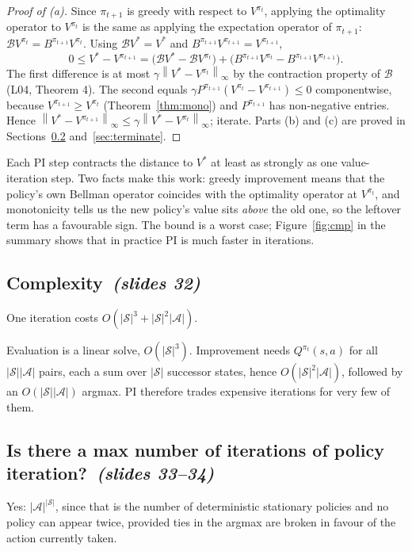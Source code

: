 \documentclass[11pt,a4paper]{article}
\newcommand{\Sset}{\mathcal{S}}
\newcommand{\Aset}{\mathcal{A}}
\newcommand{\B}{\mathcal{B}}
\newcommand{\norm}[1]{\left\lVert #1\right\rVert_\infty}
\newcommand{\sltag}[1]{\texorpdfstring{\ \emph{(slides #1)}}{ (slides #1)}}
\theoremstyle{plain}
\theoremstyle{definition}
\theoremstyle{remark}
\begin{document}
\begin{proof}[Proof of (a)]
Since $\pi_{t+1}$ is greedy with respect to $V^{\pi_t}$, applying the optimality operator to $V^{\pi_t}$ is the same as applying the expectation operator of $\pi_{t+1}$: $\B V^{\pi_t}=B^{\pi_{t+1}}V^{\pi_t}$. Using $\B V^*=V^*$ and $B^{\pi_{t+1}}V^{\pi_{t+1}}=V^{\pi_{t+1}}$,
\[
0\le V^*-V^{\pi_{t+1}}=\big(\B V^*-\B V^{\pi_t}\big)+\big(B^{\pi_{t+1}}V^{\pi_t}-B^{\pi_{t+1}}V^{\pi_{t+1}}\big).
\]
The first difference is at most $\gamma\norm{V^*-V^{\pi_t}}$ by the contraction property of $\B$ (L04, Theorem 4). The second equals $\gamma P^{\pi_{t+1}}(V^{\pi_t}-V^{\pi_{t+1}})\le0$ componentwise, because $V^{\pi_{t+1}}\ge V^{\pi_t}$ (Theorem~\ref{thm:mono}) and $P^{\pi_{t+1}}$ has non-negative entries. Hence $\norm{V^*-V^{\pi_{t+1}}}\le\gamma\norm{V^*-V^{\pi_t}}$; iterate. Parts (b) and (c) are proved in Sections~\ref{sec:maxit} and~\ref{sec:terminate}.
\end{proof}

\begin{intuition}
Each PI step contracts the distance to $V^*$ at least as strongly as one value-iteration step. Two facts make this work: greedy improvement means that the policy's own Bellman operator coincides with the optimality operator at $V^{\pi_t}$, and monotonicity tells us the new policy's value sits \emph{above} the old one, so the leftover term has a favourable sign. The bound is a worst case; Figure~\ref{fig:cmp} in the summary shows that in practice PI is much faster in iterations.
\end{intuition}

\subsection{Complexity\sltag{32}}
One iteration costs $O(|\Sset|^3+|\Sset|^2|\Aset|)$.

\begin{intuition}
Evaluation is a linear solve, $O(|\Sset|^3)$. Improvement needs $Q^{\pi_t}(s,a)$ for all $|\Sset||\Aset|$ pairs, each a sum over $|\Sset|$ successor states, hence $O(|\Sset|^2|\Aset|)$, followed by an $O(|\Sset||\Aset|)$ argmax. PI therefore trades expensive iterations for very few of them.
\end{intuition}

\subsection{Is there a max number of iterations of policy iteration?\sltag{33--34}}\label{sec:maxit}
Yes: $|\Aset|^{|\Sset|}$, since that is the number of deterministic stationary policies and no policy can appear twice, provided ties in the argmax are broken in favour of the action currently taken.
\end{document}
